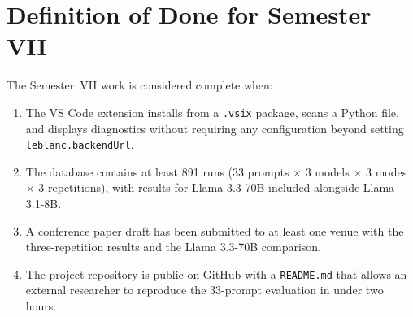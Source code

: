 \documentclass[12pt,a4paper]{report}
\begin{document}
\section{Definition of Done for Semester VII}

The Semester~VII work is considered complete when:

\begin{enumerate}
  \item The VS Code extension installs from a \texttt{.vsix} package, scans a
        Python file, and displays diagnostics without requiring any configuration
        beyond setting \texttt{leblanc.backendUrl}.
  \item The database contains at least 891 runs (33 prompts $\times$ 3 models
        $\times$ 3 modes $\times$ 3 repetitions), with results for Llama 3.3-70B
        included alongside Llama 3.1-8B.
  \item A conference paper draft has been submitted to at least one venue with
        the three-repetition results and the Llama 3.3-70B comparison.
  \item The project repository is public on GitHub with a \texttt{README.md}
        that allows an external researcher to reproduce the 33-prompt evaluation
        in under two hours.
\end{enumerate}

\printbibliography[heading=bibintoc,title={References}]
\end{document}
